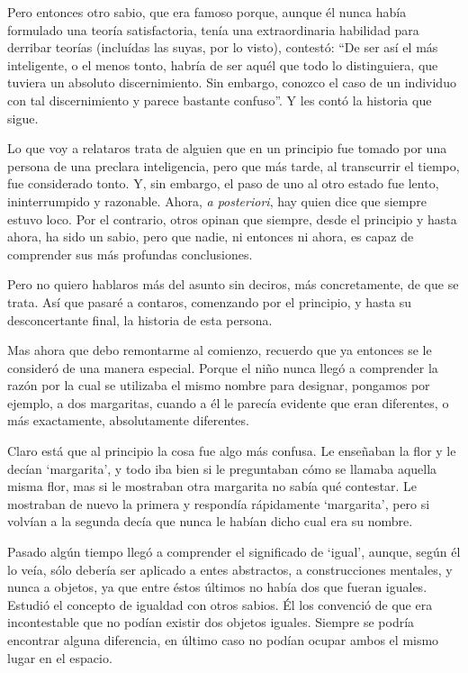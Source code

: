 Pero entonces otro sabio, que era famoso porque, aunque él nunca había
formulado una teoría satisfactoria, tenía una extraordinaria habilidad para
derribar teorías (incluídas las suyas, por lo visto), contestó: ``De ser así
el más inteligente, o el menos tonto, habría de ser aquél que todo lo
distinguiera, que tuviera un absoluto discernimiento. Sin embargo, conozco
el caso de un individuo con tal discernimiento y parece bastante confuso''.
Y les contó la historia que sigue.

Lo que voy a relataros trata de alguien que en un principio fue tomado por
una persona de una preclara inteligencia, pero que más tarde, al transcurrir
el tiempo, fue considerado tonto. Y, sin embargo, el paso de uno al otro
estado fue lento, ininterrumpido y razonable. Ahora, {\it a posteriori}, hay
quien dice que siempre estuvo loco. Por el contrario, otros opinan que
siempre, desde el principio y hasta ahora, ha sido un sabio, pero que nadie,
ni entonces ni ahora, es capaz de comprender sus más profundas conclusiones.

Pero no quiero hablaros más del asunto sin deciros, más concretamente, de
que se trata. Así que pasaré a contaros, comenzando por el principio, y
hasta su desconcertante final, la historia de esta persona.

Mas ahora que debo remontarme al comienzo, recuerdo que ya entonces se le
consideró de una manera especial. Porque el niño nunca llegó a comprender la
razón por la cual se utilizaba el mismo nombre para designar, pongamos por
ejemplo, a dos margaritas, cuando a él le parecía evidente que eran
diferentes, o más exactamente, absolutamente diferentes.

Claro está que al principio la cosa fue algo más confusa. Le enseñaban la
flor y le decían `margarita', y todo iba bien si le preguntaban cómo se
llamaba aquella misma flor, mas si le mostraban otra margarita no sabía qué
contestar. Le mostraban de nuevo la primera y respondía rápidamente
`margarita', pero si volvían a la segunda decía que nunca le habían dicho
cual era su nombre.

Pasado algún tiempo llegó a comprender el significado de `igual', aunque,
según él lo veía, sólo debería ser aplicado a entes abstractos, a
construcciones mentales, y nunca a objetos, ya que entre éstos últimos no
había dos que fueran iguales. Estudió el concepto de igualdad con otros
sabios. Él los convenció de que era incontestable que no podían existir dos
objetos iguales. Siempre se podría encontrar alguna diferencia, en último
caso no podían ocupar ambos el mismo lugar en el espacio.

